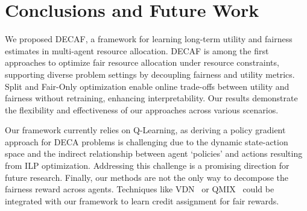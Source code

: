 \section{Conclusions and Future Work}
We proposed DECAF, a framework for learning long-term utility and fairness estimates in multi-agent resource allocation. DECAF is among the first approaches to optimize fair resource allocation under resource constraints, supporting diverse problem settings by decoupling fairness and utility metrics. Split and Fair-Only optimization enable online trade-offs between utility and fairness without retraining, enhancing interpretability. Our results demonstrate the flexibility and effectiveness of our approaches across various scenarios.
 
Our framework currently relies on Q-Learning, as deriving a policy gradient approach for DECA problems is challenging due to the dynamic state-action space and the indirect relationship between agent `policies' and actions resulting from ILP optimization. Addressing this challenge is a promising direction for future research.
Finally, our methods are not the only way to decompose the fairness reward across agents. Techniques like VDN~\citep{sunehag2017VDN} or QMIX~\citep{rashid2020QMIX} could be integrated with our framework to learn credit assignment for fair rewards.